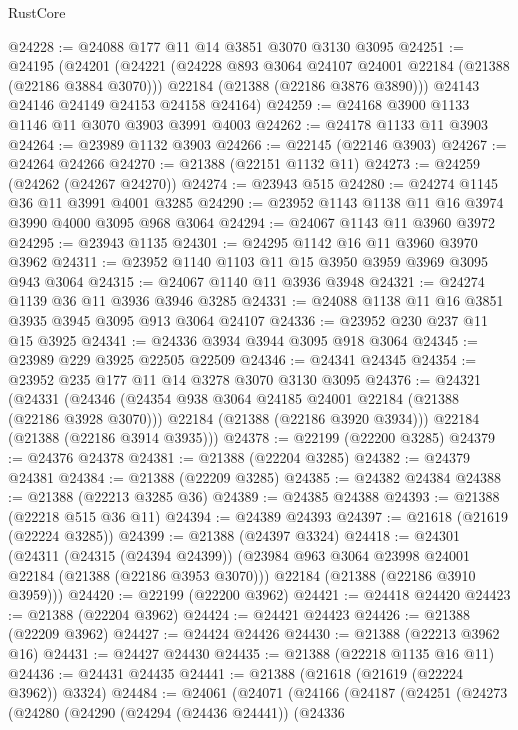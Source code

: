 \begin{lexlean}{RustCore}
\begin{coremodule}
@24228 := @24088 @177 @11 @14 @3851 @3070 @3130 @3095
@24251 := @24195
    (@24201
      (@24221
        (@24228 @893 @3064 @24107 @24001 @22184 (@21388 (@22186 @3884 @3070)))
        @22184
        (@21388 (@22186 @3876 @3890)))
      @24143
      @24146
      @24149
      @24153
      @24158
      @24164)
@24259 := @24168 @3900 @1133 @1146 @11 @3070 @3903 @3991 @4003
@24262 := @24178 @1133 @11 @3903
@24264 := @23989 @1132 @3903
@24266 := @22145 (@22146 @3903)
@24267 := @24264 @24266
@24270 := @21388 (@22151 @1132 @11)
@24273 := @24259 (@24262 (@24267 @24270))
@24274 := @23943 @515
@24280 := @24274 @1145 @36 @11 @3991 @4001 @3285
@24290 := @23952 @1143 @1138 @11 @16 @3974 @3990 @4000 @3095 @968 @3064
@24294 := @24067 @1143 @11 @3960 @3972
@24295 := @23943 @1135
@24301 := @24295 @1142 @16 @11 @3960 @3970 @3962
@24311 := @23952 @1140 @1103 @11 @15 @3950 @3959 @3969 @3095 @943 @3064
@24315 := @24067 @1140 @11 @3936 @3948
@24321 := @24274 @1139 @36 @11 @3936 @3946 @3285
@24331 := @24088 @1138 @11 @16 @3851 @3935 @3945 @3095 @913 @3064 @24107
@24336 := @23952 @230 @237 @11 @15 @3925
@24341 := @24336 @3934 @3944 @3095 @918 @3064
@24345 := @23989 @229 @3925 @22505 @22509
@24346 := @24341 @24345
@24354 := @23952 @235 @177 @11 @14 @3278 @3070 @3130 @3095
@24376 := @24321
    (@24331
      (@24346
        (@24354 @938 @3064 @24185 @24001 @22184 (@21388 (@22186 @3928 @3070)))
        @22184
        (@21388 (@22186 @3920 @3934)))
      @22184
      (@21388 (@22186 @3914 @3935)))
@24378 := @22199 (@22200 @3285)
@24379 := @24376 @24378
@24381 := @21388 (@22204 @3285)
@24382 := @24379 @24381
@24384 := @21388 (@22209 @3285)
@24385 := @24382 @24384
@24388 := @21388 (@22213 @3285 @36)
@24389 := @24385 @24388
@24393 := @21388 (@22218 @515 @36 @11)
@24394 := @24389 @24393
@24397 := @21618 (@21619 (@22224 @3285))
@24399 := @21388 (@24397 @3324)
@24418 := @24301
    (@24311
      (@24315 (@24394 @24399))
      (@23984 @963 @3064 @23998 @24001 @22184 (@21388 (@22186 @3953 @3070)))
      @22184
      (@21388 (@22186 @3910 @3959)))
@24420 := @22199 (@22200 @3962)
@24421 := @24418 @24420
@24423 := @21388 (@22204 @3962)
@24424 := @24421 @24423
@24426 := @21388 (@22209 @3962)
@24427 := @24424 @24426
@24430 := @21388 (@22213 @3962 @16)
@24431 := @24427 @24430
@24435 := @21388 (@22218 @1135 @16 @11)
@24436 := @24431 @24435
@24441 := @21388 (@21618 (@21619 (@22224 @3962)) @3324)
@24484 := @24061
    (@24071
      (@24166
        (@24187
          (@24251
            (@24273
              (@24280
                (@24290
                  (@24294 (@24436 @24441))
                  (@24336

\end{coremodule}
\end{lexlean}
